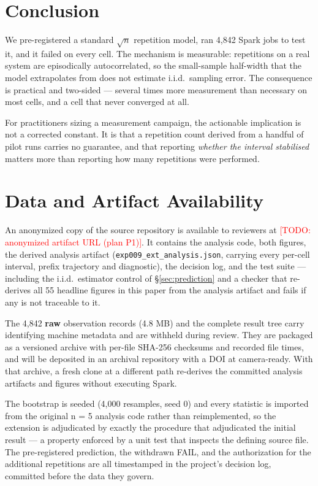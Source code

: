 \documentclass[sigconf,review,anonymous]{acmart}
\newcommand{\TODO}[1]{\textcolor{red}{[TODO: #1]}}
\newcommand{\ArtifactURL}{\TODO{anonymized artifact URL (plan P1)}}
\begin{document}
\section{Conclusion}

We pre-registered a standard $\sqrt{n}$ repetition model, ran 4,842 Spark jobs to test it, and it failed
on every cell. The mechanism is measurable: repetitions on a real system are episodically
autocorrelated, so the small-sample half-width that the model extrapolates from does not
estimate i.i.d.\ sampling error. The consequence is practical and two-sided --- several times more
measurement than necessary on most cells, and a cell that never converged at all.

For practitioners sizing a measurement campaign, the actionable implication is not a corrected
constant. It is that a repetition count derived from a handful of pilot runs carries no
guarantee, and that reporting \emph{whether the interval stabilised} matters more than reporting how
many repetitions were performed.

\section{Data and Artifact Availability}

An anonymized copy of the source repository is available to reviewers at \ArtifactURL. It
contains the analysis code, both figures, the derived analysis artifact
(\texttt{exp009\_ext\_analysis.json}, carrying every per-cell interval, prefix trajectory and
diagnostic), the decision log, and the test suite --- including the i.i.d.\ estimator control of
\S\ref{sec:prediction} and a checker that re-derives all 55 headline figures in this paper from the
analysis artifact and fails if any is not traceable to it.

The 4,842 \textbf{raw} observation records (4.8 MB) and the complete result tree carry identifying
machine metadata and are withheld during review. They are packaged as a versioned archive with
per-file SHA-256 checksums and recorded file times, and will be deposited in an archival repository
with a DOI at camera-ready. With that archive, a fresh clone at a different path re-derives the
committed analysis artifacts and figures without executing Spark.

The bootstrap is seeded (4,000 resamples, seed 0) and every statistic is imported from the original
n = 5 analysis code rather than reimplemented, so the extension is adjudicated by exactly the
procedure that adjudicated the initial result --- a property enforced by a unit test that inspects
the defining source file. The pre-registered prediction, the withdrawn FAIL, and the authorization
for the additional repetitions are all timestamped in the project's decision log, committed before
the data they govern.
\end{document}
